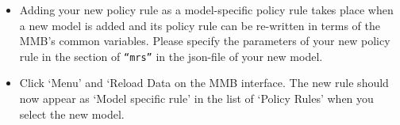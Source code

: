 \begin{itemize}
\item Adding your new policy rule as a model-specific policy rule takes place when a new model is added and its policy rule can be re-written in terms of the MMB's common variables. Please specify the parameters of your new policy rule in the section of \texttt{“mrs”} in the json-file of your new model.
\item Click `Menu' and `Reload Data on the MMB interface. The new rule should now appear as `Model specific rule' in the list of `Policy Rules' when you select the new model.
\end{itemize}


